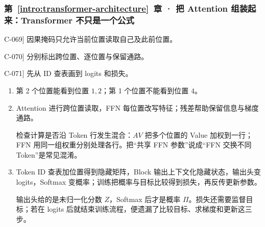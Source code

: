 \subsubsection*{第~\ref*{intro:transformer-architecture}~章 · 把 Attention 组装起来：Transformer 不只是一个公式}
\begin{answerhints}
\item[\hyperref[exercise:causal-position-visibility]{C-069}] \leavevmode{}\label{hint:causal-position-visibility}因果掩码只允许当前位置读取自己及此前位置。
\item[\hyperref[exercise:block-branch-roles]{C-070}] \leavevmode{}\label{hint:block-branch-roles}分别标出跨位置、逐位置与保留通路。
\item[\hyperref[exercise:token-to-loss-pipeline]{C-071}] \leavevmode{}\label{hint:token-to-loss-pipeline}先从 ID 查表画到 logits 和损失。
\end{answerhints}
\begin{enumerate}[label={},leftmargin=4.8em,itemsep=4pt]
\item[\textbf{\hyperref[exercise:causal-position-visibility]{C-069.}}] \leavevmode{}\label{solution:C-069}\label{solution:causal-position-visibility}第 2 个位置能看到位置 $1,2$；第 1 个位置不能看到位置 $4$。
\item[\textbf{\hyperref[exercise:block-branch-roles]{C-070.}}] \leavevmode{}\label{solution:C-070}\label{solution:block-branch-roles}Attention 进行跨位置读取，FFN 每位置改写特征；残差帮助保留信息与梯度通路。\par 检查计算是否沿 Token 行发生混合：$AV$ 把多个位置的 Value 加权到一行；FFN 用同一组权重分别处理各行。把“共享 FFN 参数”说成“FFN 交换不同 Token”是常见混淆。
\item[\textbf{\hyperref[exercise:token-to-loss-pipeline]{C-071.}}] \leavevmode{}\label{solution:C-071}\label{solution:token-to-loss-pipeline}Token ID 查表加位置得到隐藏矩阵，Block 输出上下文化隐藏状态，输出头变 logits，Softmax 变概率；训练把概率与目标比较得到损失，再反传更新参数。\par 输出头给的是未归一化分数 $Z$，Softmax 后才是概率 $\Pi$。损失还需要监督目标；若在 logits 后就结束训练流程，便遗漏了比较目标、求梯度和更新这三步。
\end{enumerate}
